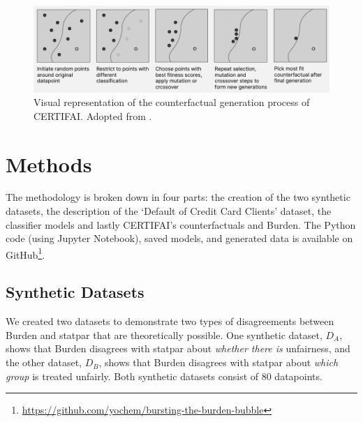 \documentclass[runningheads]{llncs}
\begin{document}
\begin{figure}
    \centering
    \includegraphics[width=\textwidth]{img/counterfactual_generation.png}
    \caption{Visual representation of the counterfactual generation process of CERTIFAI. Adopted from \cite{certifai}.}
    \label{fig:cf-generation}
\end{figure}


\section{Methods}\label{sec:methods}
The methodology is broken down in four parts: the creation of the two synthetic datasets, the description of the `Default of Credit Card Clients' dataset, the classifier models and lastly CERTIFAI's counterfactuals and Burden. The Python code (using Jupyter Notebook), saved models, and generated data is available on GitHub\footnote{\url{https://github.com/yochem/bursting-the-burden-bubble}}.

\subsection{Synthetic Datasets}\label{sec:syndata}

We created two datasets to demonstrate two types of disagreements between \gls{Burden} and \gls{statpar} that are theoretically possible. One synthetic dataset, $D_A$, shows that \gls{Burden} disagrees with \gls{statpar} about \textit{whether there is} unfairness, and the other dataset, $D_B$, shows that \gls{Burden} disagrees with \gls{statpar} about \emph{which group} is treated unfairly. Both synthetic datasets consist of 80 datapoints.
\end{document}
